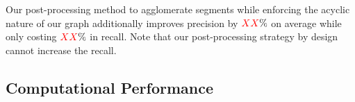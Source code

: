 Our post-processing method to agglomerate segments while enforcing the acyclic nature of our graph additionally improves precision by $\textcolor{red}{XX}\%$ on average while only costing $\textcolor{red}{XX}\%$ in recall. 
Note that our post-processing strategy by design cannot increase the recall. 

\subsection{Computational Performance}

